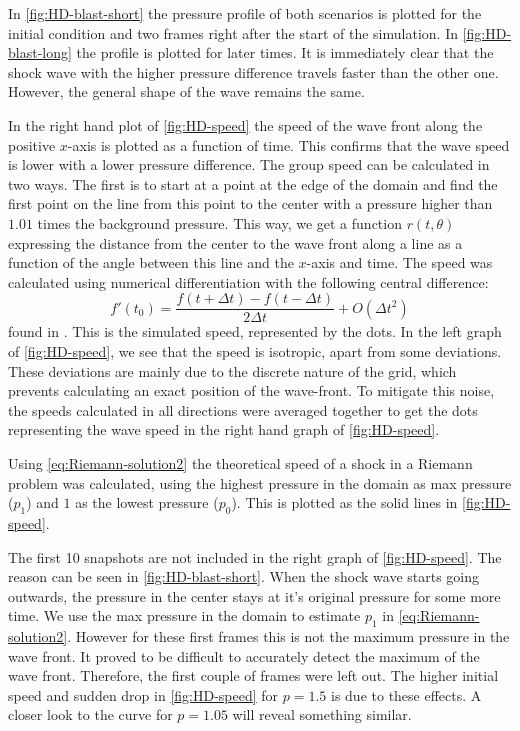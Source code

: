 In \cref{fig:HD-blast-short} the pressure profile of both scenarios is plotted for the initial condition and two frames right after the start of the simulation.
In \cref{fig:HD-blast-long} the profile is plotted for later times.
It is immediately clear that the shock wave with the higher pressure difference travels faster than the other one. However, the general shape of the wave remains the same.


In the right hand plot of \cref{fig:HD-speed} the speed of the wave front along the positive $x$-axis is plotted as a function of time. This confirms that the wave speed is lower with a lower pressure difference.
The group speed can be calculated in two ways. 
The first is to start at a point at the edge of the domain and find the first point on the line from this point to the center with a pressure higher than $1.01$ times the background pressure.
This way, we get a function $r(t,\theta)$ expressing the distance from the center to the wave front along a line as a function of the angle between this line and the $x$-axis and time.
The speed was calculated using numerical differentiation with the following central difference:
\begin{equation*}
	f'(t_0) = \frac{f(t+\Delta t)-f(t-\Delta t)}{2\Delta t} + O(\Delta t^2)
\end{equation*}
found in \cite{numerieke-wiskunde}. 
This is the simulated speed, represented by the dots.
In the left graph of \cref{fig:HD-speed}, we see that the speed is isotropic, apart from some deviations.
These deviations are mainly due to the discrete nature of the grid, which prevents calculating an exact position of the wave-front.
To mitigate this noise, the speeds calculated in all directions were averaged together to get the dots representing the wave speed in the right hand graph of \cref{fig:HD-speed}.

Using \cref{eq:Riemann-solution2} the theoretical speed of a shock in a Riemann problem was calculated, using the highest pressure in the domain as max pressure ($p_1$) and $1$ as the lowest pressure ($p_0$). This is plotted as the solid lines in \cref{fig:HD-speed}.

The first 10 snapshots are not included in the right graph of \cref{fig:HD-speed}. 
The reason can be seen in \cref{fig:HD-blast-short}. 
When the shock wave starts going outwards, the pressure in the center stays at it's original pressure for some more time.
We use the max pressure in the domain to estimate $p_1$ in \cref{eq:Riemann-solution2}. However for these first frames this is not the maximum pressure in the wave front.
It proved to be difficult to accurately detect the maximum of the wave front. Therefore, the first couple of frames were left out.
The higher initial speed and sudden drop in \cref{fig:HD-speed} for $p=1.5$ is due to these effects. A closer look to the curve for $p=1.05$ will reveal something similar.

